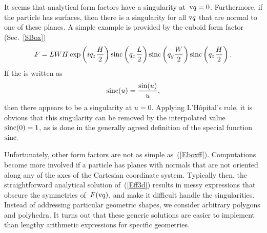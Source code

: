 %
It seems that  analytical form factors have a singularity at~$\text{v}{q}=0$.
Furthermore, if the particle has  surfaces,
then there is a singularity for all $\text{v}{q}$ that are normal to one of these planes.
A simple example is provided by the cuboid form factor (Sec.~\ref{SBox})
\begin{equation}\label{Eboxff}
F= L W H\exp\left(i q_z \frac{H}{2}\right) \operatorname{sinc}\left(q_x \frac{L}{2}\right)
\operatorname{sinc}\left(q_y \frac{W}{2}\right) \operatorname{sinc}\left(q_z \frac{H}{2}\right).
\end{equation}
If the  is written as
\begin{equation}\label{Esinc}
  \operatorname{sinc}(u) = \frac{\sin(u)}{u},
\end{equation}
then there appears to be a singularity at $u=0$.
Applying L'H\^opital's rule, it is obvious
that this singularity can be removed by the interpolated value
$\operatorname{sinc}(0)=1$,
as is done in the generally agreed definition of the special function~$\operatorname{sinc}$.

Unfortunately, other form factors are not as simple as~(\ref{Eboxff}).
Computations become more involved
if a particle has planes with normals that are not oriented along
any of the axes of the Cartesian coordinate system.
Typically then, the straightforward analytical solution of~(\ref{Eff3d})
results in messy expressions that obscure the symmetries of~$F(\text{v}{q})$,
and make it difficult handle the singularities.
Instead of addressing particular geometric shapes,
we consider arbitrary polygons and polyhedra.
It turns out that these generic solutions
are easier to implement
than lengthy arithmetic expressions for specific geometries.

\iffalse
As a final preparation,
let us anticipate that we will encounter terms like
\begin{equation}\label{Eexpcancel}
  \frac{\e^u-1}{u},\text{~or~}\frac{\e^u-1-u}{u^2}.
\end{equation}
Like in~(\ref{Esinc}), the singularity at~$u=0$ is removable.
Close to the singularity, however, we must expect a loss of numeric
precision because of cancellation with the numerator.
To deal with the first of these cases, the POSIX standard
for portable computer operating system interfaces foresees a function
\begin{equation}\label{Eexpm1}
  \expmone(u)\coloneqq \e^u-1
\end{equation}
that ought to be computed to standard floating-point accuracy
even for $u\to0$.
However, POSIX does not mandate implementation for complex arguments,
so that we need to provide our own implementation.
Furthermore,
we implement
\begin{equation}\label{Eexpm1}
  \expmtwo(u)\coloneqq \e^u-1-u
\end{equation}
to deal with the second case in~(\ref{Eexpcancel}).
\fi

